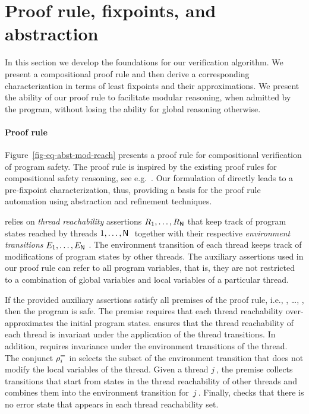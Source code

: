 \section{Proof rule, fixpoints, and abstraction}\label{sec-proof-rule}


In this section we develop the foundations for our verification
algorithm.
We present a compositional proof rule and then derive a corresponding
characterization in terms of least fixpoints and their approximations.
We present the ability of our proof rule to facilitate modular
reasoning, when admitted by the program, without losing the ability
for global reasoning otherwise.

\paragraph{Proof rule}

Figure~\ref{fig-eq-abst-mod-reach} presents a proof rule \ProofRule
for compositional verification of program safety.
The proof rule is inspired by the existing proof rules for
compositional safety reasoning, see
e.g.~\cite{OwickiAI76,JonesTOPLAS83,CohenFMSD09,HenzingerPLDI04}.
Our formulation of \ProofRule directly leads to a pre-fixpoint
characterization, thus, providing a basis for the proof rule
automation using abstraction and refinement techniques.

\ProofRule relies on \emph{thread reachability} assertions $R_1,
\dots, R_{\mathsf{N}}$ that keep track of program states reached
by threads $1, \dots, \mathsf{N}\ $ together with their respective
\emph{environment transitions} $E_1, \dots, E_{\mathsf{N}}\ $.
The environment transition of each thread keeps track of modifications
of program states by other threads.
The auxiliary assertions used in our proof rule can refer to all
program variables, that is, they are not restricted to a combination
of global variables and local variables of a particular thread. 


If the provided auxiliary assertions satisfy all premises of the proof
rule, i.e., , \dots, , then the program is safe.
The premise  requires that each thread reachability
over-approximates the initial program states.
 ensures that the thread reachability of each thread is
invariant under the application of the thread transitions.
In addition,  requires invariance under the environment
transitions of the thread. 
The conjunct $\rho^=_{i}$ in  selects the subset of
the environment transition that does not modify the local variables of
the thread.
Given a thread $j\ $, the premise  collects transitions
that start from states in the thread reachability of other threads and
combines them into the environment transition for~$j\ $.
Finally,  checks that there is no error state that appears
in each thread reachability set.


